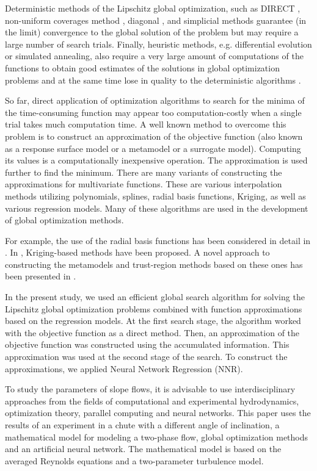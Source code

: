 \documentclass[mathematics,article,submit,pdftex,moreauthors]{Definitions/mdpi}
\begin{document}
Deterministic methods of the Lipschitz global optimization, such as DIRECT \cite{Jones2009}, non-uniform coverages method \cite{Evtushenko2009, Evtushenko2013}, diagonal \cite{Sergeyev2017}, and simplicial \cite{Zilinskas2014} methods guarantee (in the limit) convergence to the global solution of the problem but may require a large number of search trials.
Finally, heuristic methods, e.g. differential evolution or simulated annealing, also require a very large amount of computations of the functions to obtain good estimates of the solutions in global optimization problems and at the same time lose in quality to the deterministic algorithms \cite{Sergeyev2018,Kvasov2018}.

So far, direct application of optimization algorithms to search for the minima of the time-consuming function may appear too computation-costly when a single trial takes much computation time. 
A well known method to overcome this problem is to construct an approximation of the objective function (also known as a response surface model or a metamodel or a surrogate model). Computing its values is a computationally inexpensive operation. The approximation is used further to find the minimum.
There are many variants of constructing the approximations for multivariate functions. These are various interpolation methods utilizing polynomials, splines, radial basis functions, Kriging, as well as various regression models. Many of these algorithms are used in the development of global optimization methods.

For example, the use of the radial basis functions has been considered in detail in \cite{Gutmann2001,Regis2005}. In \cite{Jones1998,UrRehman2014,Ollar2017_1}, Kriging-based methods have been proposed. A novel approach to constructing the metamodels and trust-region methods based on these ones has been presented in \cite{Polynkin2012,Ollar2017_2,Toropov2018}. 

In the present study, we used an efficient global search algorithm \cite{Strongin2000,Sergeyev2013} for solving the Lipschitz global optimization problems combined with function approximations based on the regression models. At the first search stage, the algorithm worked with the objective function as a direct method. Then, an approximation of the objective function was constructed using the accumulated information. This approximation was used at the second stage of the search.
To construct the approximations, we applied Neural Network Regression (NNR).

To study the parameters of slope flows, it is advisable to use interdisciplinary approaches from the fields of computational and experimental hydrodynamics, optimization theory, parallel computing and neural networks. This paper uses the results of an experiment in a chute with a different angle of inclination, a mathematical model for modeling a two-phase flow, global optimization methods and an artificial neural network. The mathematical model is based on the averaged Reynolds equations and a two-parameter turbulence model. 
\end{document}
